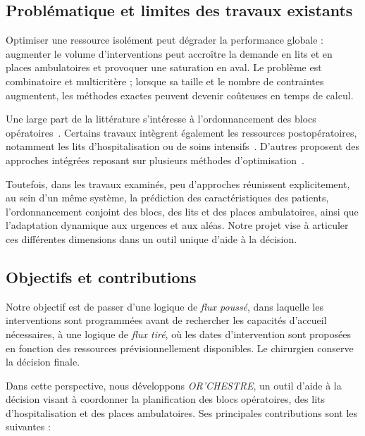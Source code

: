 \documentclass[11pt,a4paper]{article}
\begin{document}
\subsection{Problématique et limites des travaux existants}

Optimiser une ressource isolément peut dégrader la performance globale : augmenter le volume d'interventions peut accroître la demande en lits et en places ambulatoires et provoquer une saturation en aval. Le problème est combinatoire et multicritère ; lorsque sa taille et le nombre de contraintes augmentent, les méthodes exactes peuvent devenir coûteuses en temps de calcul.

Une large part de la littérature s'intéresse à l'ordonnancement des blocs opératoires~\cite{cardoen2010}. Certains travaux intègrent également les ressources postopératoires, notamment les lits d'hospitalisation ou de soins intensifs~\cite{schneider2020,augustin2022}. D'autres proposent des approches intégrées reposant sur plusieurs méthodes d'optimisation~\cite{fei2010,vieira2025}.

Toutefois, dans les travaux examinés, peu d'approches réunissent explicitement, au sein d'un même système, la prédiction des caractéristiques des patients, l'ordonnancement conjoint des blocs, des lits et des places ambulatoires, ainsi que l'adaptation dynamique aux urgences et aux aléas. Notre projet vise à articuler ces différentes dimensions dans un outil unique d'aide à la décision.

\subsection{Objectifs et contributions}

Notre objectif est de passer d'une logique de \emph{flux poussé}, dans laquelle les interventions sont programmées avant de rechercher les capacités d'accueil nécessaires, à une logique de \emph{flux tiré}, où les dates d'intervention sont proposées en fonction des ressources prévisionnellement disponibles. Le chirurgien conserve la décision finale.

Dans cette perspective, nous développons \emph{OR'CHESTRE}, un outil d'aide à la décision visant à coordonner la planification des blocs opératoires, des lits d'hospitalisation et des places ambulatoires. Ses principales contributions sont les suivantes :
\end{document}
